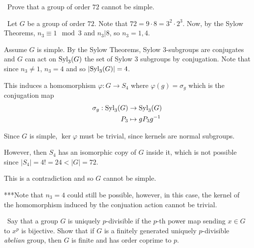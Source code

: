 \documentclass[12pt]{AlgebraQual}
\begin{document}
\begin{problem} $\,$
Prove that a group of order $72$ cannot be simple.
\end{problem}


\begin{solution}$\,$
Let $G$ be a group of order $72$. Note that $72=9\cdot8=3^2\cdot 2^3$. Now, by the Sylow Theorems, $n_3\equiv 1\mod 3$ and $n_3|8$, so $n_3=1,4$.

Assume $G$ is simple. By the Sylow Theorems, Sylow $3$-subgroups are conjugates and $G$ can act on $\text{Syl}_3(G)$ the set of Sylow $3$ subgroups by conjugation. Note that since $n_3\not=1$, $n_3=4$ and so $|\text{Syl}_3(G)|=4$.

This induces a homomorphism $\varphi:G\to S_4$ where $\varphi(g)=\sigma_g$ which is the conjugation map \begin{align*}
    \sigma_g:\text{Syl}_3(G)&\to\text{Syl}_3(G)\\
    P_3&\mapsto gP_3g^{-1}
\end{align*}

Since $G$ is simple, $\ker\varphi$ must be trivial, since kernels are normal subgroups.

However, then $S_4$ has an isomorphic copy of $G$ inside it, which is not possible since $|S_4|=4!=24<|G|=72$.

This is a contradiction and so $G$ cannot be simple.

***Note that $n_3=4$ could still be possible, however, in this case, the kernel of the homomorphism induced by the conjuation action cannot be trivial.
\end{solution}
\newpage


\begin{problem} $\,$
Say that a group $G$ is uniquely $p$-divisible if the $p$-th power map sending $x\in G$ to $x^p$ is bijective. Show that if $G$ is a finitely generated uniquely $p$-divisible \textit{abelian} group, then $G$ is finite and has order coprime to $p.$
\end{problem}
\end{document}

